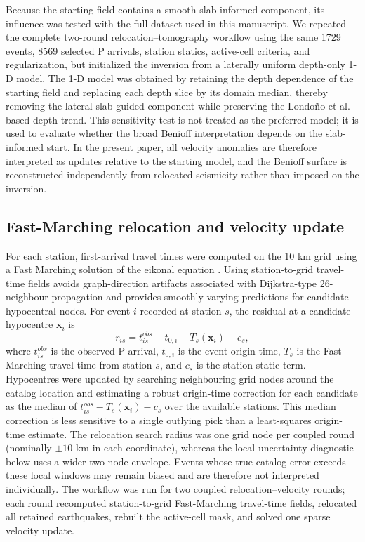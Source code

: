 \documentclass[review,authoryear]{elsarticle}
\begin{document}
Because the starting field contains a smooth slab-informed component, its influence was tested with the full dataset used in this manuscript. We repeated the complete two-round relocation--tomography workflow using the same 1729 events, 8569 selected P arrivals, station statics, active-cell criteria, and regularization, but initialized the inversion from a laterally uniform depth-only 1-D model. The 1-D model was obtained by retaining the depth dependence of the starting field and replacing each depth slice by its domain median, thereby removing the lateral slab-guided component while preserving the Londo\~no et al.-based depth trend. This sensitivity test is not treated as the preferred model; it is used to evaluate whether the broad Benioff interpretation depends on the slab-informed start. In the present paper, all velocity anomalies are therefore interpreted as updates relative to the starting model, and the Benioff surface is reconstructed independently from relocated seismicity rather than imposed on the inversion.

\subsection{Fast-Marching relocation and velocity update}
For each station, first-arrival travel times were computed on the 10 km grid using a Fast Marching solution of the eikonal equation \citep{Sethian1996,Zhao2005}. Using station-to-grid travel-time fields avoids graph-direction artifacts associated with Dijkstra-type 26-neighbour propagation and provides smoothly varying predictions for candidate hypocentral nodes. For event $i$ recorded at station $s$, the residual at a candidate hypocentre $\mathbf{x}_i$ is
\begin{equation}
r_{is}=t^{obs}_{is}-t_{0,i}-T_s(\mathbf{x}_i)-c_s ,
\end{equation}
where $t^{obs}_{is}$ is the observed P arrival, $t_{0,i}$ is the event origin time, $T_s$ is the Fast-Marching travel time from station $s$, and $c_s$ is the station static term. Hypocentres were updated by searching neighbouring grid nodes around the catalog location and estimating a robust origin-time correction for each candidate as the median of $t^{obs}_{is}-T_s(\mathbf{x}_i)-c_s$ over the available stations. This median correction is less sensitive to a single outlying pick than a least-squares origin-time estimate. The relocation search radius was one grid node per coupled round (nominally $\pm10$ km in each coordinate), whereas the local uncertainty diagnostic below uses a wider two-node envelope. Events whose true catalog error exceeds these local windows may remain biased and are therefore not interpreted individually. The workflow was run for two coupled relocation--velocity rounds; each round recomputed station-to-grid Fast-Marching travel-time fields, relocated all retained earthquakes, rebuilt the active-cell mask, and solved one sparse velocity update.
\end{document}

